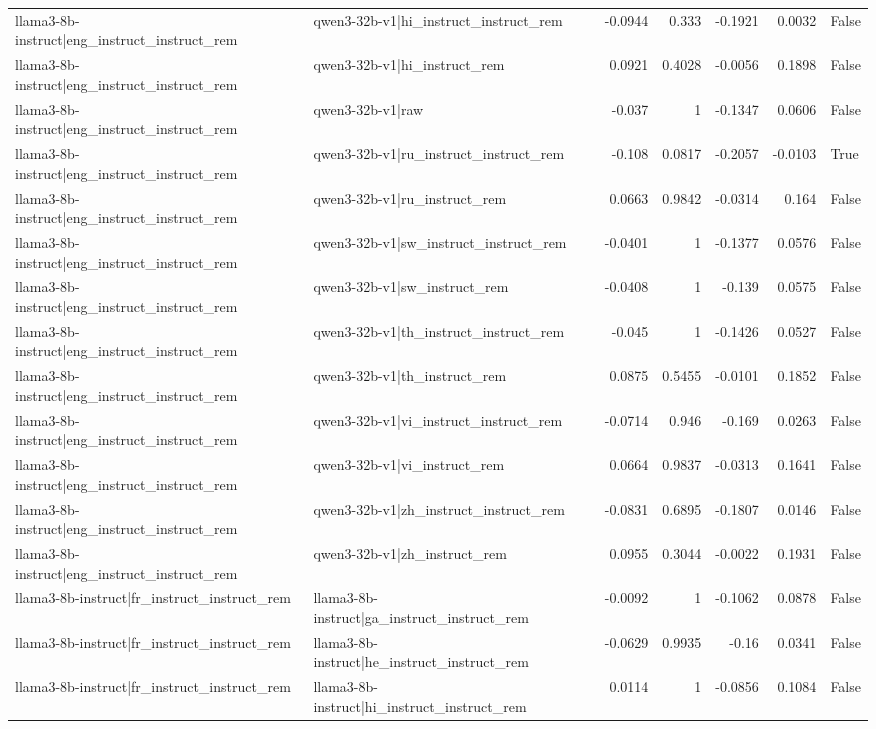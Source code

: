 \begin{table}
\begin{tabular}{l l r r r r l}
llama3-8b-instruct|eng_instruct_instruct_rem & qwen3-32b-v1|hi_instruct_instruct_rem & -0.0944 & 0.333 & -0.1921 & 0.0032 & False \\
llama3-8b-instruct|eng_instruct_instruct_rem & qwen3-32b-v1|hi_instruct_rem & 0.0921 & 0.4028 & -0.0056 & 0.1898 & False \\
llama3-8b-instruct|eng_instruct_instruct_rem & qwen3-32b-v1|raw & -0.037 & 1 & -0.1347 & 0.0606 & False \\
llama3-8b-instruct|eng_instruct_instruct_rem & qwen3-32b-v1|ru_instruct_instruct_rem & -0.108 & 0.0817 & -0.2057 & -0.0103 & True \\
llama3-8b-instruct|eng_instruct_instruct_rem & qwen3-32b-v1|ru_instruct_rem & 0.0663 & 0.9842 & -0.0314 & 0.164 & False \\
llama3-8b-instruct|eng_instruct_instruct_rem & qwen3-32b-v1|sw_instruct_instruct_rem & -0.0401 & 1 & -0.1377 & 0.0576 & False \\
llama3-8b-instruct|eng_instruct_instruct_rem & qwen3-32b-v1|sw_instruct_rem & -0.0408 & 1 & -0.139 & 0.0575 & False \\
llama3-8b-instruct|eng_instruct_instruct_rem & qwen3-32b-v1|th_instruct_instruct_rem & -0.045 & 1 & -0.1426 & 0.0527 & False \\
llama3-8b-instruct|eng_instruct_instruct_rem & qwen3-32b-v1|th_instruct_rem & 0.0875 & 0.5455 & -0.0101 & 0.1852 & False \\
llama3-8b-instruct|eng_instruct_instruct_rem & qwen3-32b-v1|vi_instruct_instruct_rem & -0.0714 & 0.946 & -0.169 & 0.0263 & False \\
llama3-8b-instruct|eng_instruct_instruct_rem & qwen3-32b-v1|vi_instruct_rem & 0.0664 & 0.9837 & -0.0313 & 0.1641 & False \\
llama3-8b-instruct|eng_instruct_instruct_rem & qwen3-32b-v1|zh_instruct_instruct_rem & -0.0831 & 0.6895 & -0.1807 & 0.0146 & False \\
llama3-8b-instruct|eng_instruct_instruct_rem & qwen3-32b-v1|zh_instruct_rem & 0.0955 & 0.3044 & -0.0022 & 0.1931 & False \\
llama3-8b-instruct|fr_instruct_instruct_rem & llama3-8b-instruct|ga_instruct_instruct_rem & -0.0092 & 1 & -0.1062 & 0.0878 & False \\
llama3-8b-instruct|fr_instruct_instruct_rem & llama3-8b-instruct|he_instruct_instruct_rem & -0.0629 & 0.9935 & -0.16 & 0.0341 & False \\
llama3-8b-instruct|fr_instruct_instruct_rem & llama3-8b-instruct|hi_instruct_instruct_rem & 0.0114 & 1 & -0.0856 & 0.1084 & False \\

\end{tabular}
\end{table}
